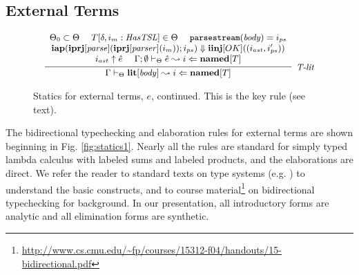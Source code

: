 \subsection{External Terms}
\begin{figure}[t]
\centering
\[
\footnotesize
\begin{array}{c}
\infer[\textit{T-lit}]
	  {\Gamma \vdash_\Theta \keyw{lit}[\mathit{body}] \leadsto i \Leftarrow \keyw{named}[T]}
	  {\begin{array}{c}
	   \Theta_0 \subset \Theta ~~~~
	   T[\delta, i_m : \mathit{HasTSL}] \in \Theta ~~~~
	   \mathtt{parsestream}(\mathit{body})=i_{ps} \\
	   \keyw{iap}(\keyw{iprj}[\mathit{parse}](\keyw{iprj}[\mathit{parser}](i_m)); i_{ps}) \Downarrow \keyw{iinj}[OK]((i_{ast}, i'_{ps}))\\
	   i_{ast} \uparrow \ih~~~~
	   \Gamma; \emptyset \vdash_\Theta \ih \leadsto i \Leftarrow \keyw{named}[T]
	   \end{array}}
\end{array}
\]
\caption{Statics for external terms, $e$, continued. This is the key rule (see text).}
\label{fig:statics-lit}
\end{figure}

The bidirectional typechecking and elaboration rules for external terms are shown beginning in Fig. \ref{fig:statics1}. Nearly all the rules are standard for simply typed lambda calculus with labeled sums and labeled products, and the elaborations are direct. We refer the reader to standard texts on type systems (e.g. \cite{pfpl}) to understand the basic constructs, and to course material\footnote{\small \url{http://www.cs.cmu.edu/~fp/courses/15312-f04/handouts/15-bidirectional.pdf}} on bidirectional typechecking for background. In our presentation, all introductory forms are analytic and all elimination forms are synthetic. 

